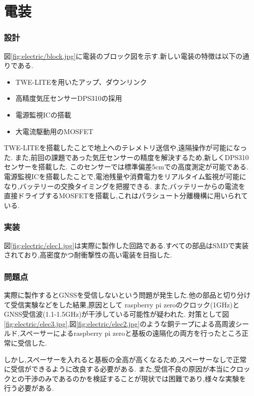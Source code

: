 \part*{電装}
\section{設計}
図\ref{fig:electric/block.jpg}に電装のブロック図を示す.新しい電装の特徴は以下の通りである.
\begin{itemize}
\item TWE-LITEを用いたアップ、ダウンリンク
\item 高精度気圧センサーDPS310の採用
\item 電源監視ICの搭載
\item 大電流駆動用のMOSFET
\end{itemize}
TWE-LITEを搭載したことで地上へのテレメトリ送信や,遠隔操作が可能になった.
また,前回の課題であった気圧センサーの精度を解決するため,新しくDPS310センサーを搭載した.
このセンサーでは標準偏差5\si{\cm}での高度測定が可能である.
電源監視ICを搭載したことで,電池残量や消費電力をリアルタイム監視が可能になり,バッテリーの交換タイミングを把握できる.
また,バッテリーからの電流を直接ドライブするMOSFETを搭載し,これはパラシュート分離機構に用いられている.
\section{実装}
図\ref{fig:electric/elec1.jpg}は実際に製作した回路である.すべての部品はSMDで実装されており,高密度かつ耐衝撃性の高い電装を目指した.
\section{問題点}
実際に製作するとGNSSを受信しないという問題が発生した.他の部品と切り分けて受信実験などをした結果,原因として
raspberry pi zeroのクロック(1\si{\GHz})とGNSS受信波(1.1-1.5\si{\GHz})が干渉している可能性が疑われた.
対策として図\ref{fig:electric/elec3.jpg},図\ref{fig:electric/elec2.jpg}のような銅テープによる高周波シールド,スペーサーによるraspberry pi zeroと基板の遠隔化の両方を行ったところ正常に受信した.

しかし,スペーサーを入れると基板の全高が高くなるため,スペーサーなしで正常に受信ができるように改良する必要がある.
また,受信不良の原因が本当にクロックとの干渉のみであるのかを検証することが現状では困難であり,様々な実験を行う必要がある.